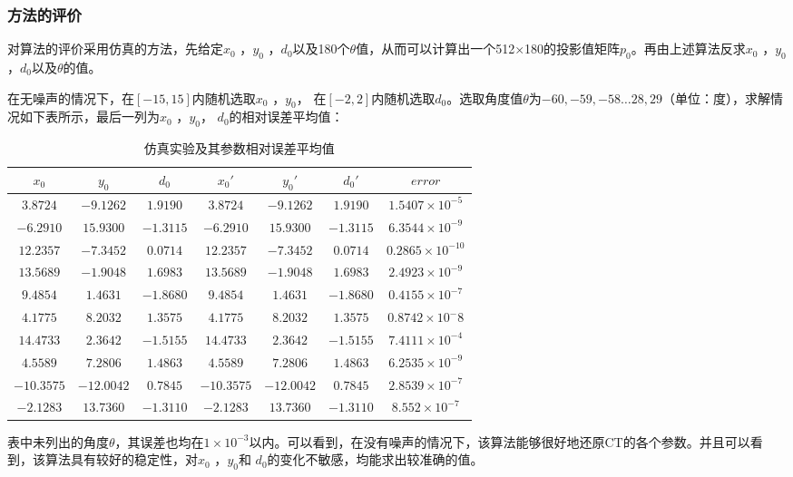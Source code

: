\documentclass{myart}
\begin{document}
\subsubsection{方法的评价}

对算法的评价采用仿真的方法，先给定\( x_0 \) ，\(y_0\) ，\( d_0 \)以及180个\(\theta\)值，从而可以计算出一个512\(\times\)180的投影值矩阵\(p_{0}\)。再由上述算法反求\( x_0 \) ，\(y_0\) ，\( d_0 \)以及\(\theta\)的值。

在无噪声的情况下，在\([-15, 15]\)内随机选取\( x_0 \) ，\(y_0\)， 在\([-2, 2]\)内随机选取\(d_0\)。选取角度值\(\theta\)为\( -60, -59, -58 \ldots 28, 29\)（单位：度），求解情况如下表所示，最后一列为\( x_0 \) ，\(y_0\)， \(d_0\)的相对误差平均值：

\begin{table}[htbp]
  \centering
  \caption{仿真实验及其参数相对误差平均值}
    \begin{tabular}{ccccccc}
    \toprule
    \(x_0\)    & \(y_0\)    & \(d_0\)    & \(x_0'\) & \(y_0'\) & \(d_0'\) & \(error\) \\
    \midrule
    \(3.8724  \) & \(-9.1262 \) & \(1.9190 \) & \(3.8724 \) & \(-9.1262 \) & \(1.9190 \) & \(1.5407\times 10^{-5}\)\\
    \(-6.2910 \) & \(15.9300 \) & \(-1.3115 \) & \(-6.2910 \) & \(15.9300 \) & \(-1.3115 \) & \(6.3544\times 10^{-9}\) \\
    \(12.2357 \) & \(-7.3452 \) & \(0.0714 \) & \(12.2357 \) & \(-7.3452 \) & \(0.0714 \) & \(0.2865\times 10^{-10}\) \\
    \(13.5689 \) & \(-1.9048 \) & \(1.6983 \) & \(13.5689 \) & \(-1.9048 \) & \(1.6983 \) & \(2.4923\times 10^{-9}\) \\
    \(9.4854  \) & \(1.4631 \) & \(-1.8680 \) & \(9.4854 \) & \(1.4631 \) & \(-1.8680 \) & \(0.4155\times 10^{-7}\) \\
    \(4.1775  \) & \(8.2032 \) & \(1.3575 \) & \(4.1775 \) & \(8.2032 \) & \(1.3575 \) & \(0.8742\times 10^-{8}\) \\
    \(14.4733 \) & \(2.3642 \) & \(-1.5155 \) & \(14.4733 \) & \(2.3642 \) & \(-1.5155 \) & \(7.4111\times 10^{-4}\) \\
    \(4.5589  \) & \(7.2806 \) & \(1.4863 \) & \(4.5589 \) & \(7.2806 \) & \(1.4863 \) & \(6.2535\times 10^{-9}\) \\
    \(-10.3575\) & \(-12.0042 \) & \(0.7845 \) & \(-10.3575 \) & \(-12.0042 \) & \(0.7845 \) & \(2.8539\times 10^{-7}\) \\
    \(-2.1283 \) & \(13.7360 \) & \(-1.3110 \) & \(-2.1283 \) & \(13.7360 \) & \(-1.3110 \) & \(8.552\times 10^{-7}\) \\
    \bottomrule
    \end{tabular}%
  \label{tab:addlabel}%
\end{table}
表中未列出的角度\(\theta\)，其误差也均在\(1\times10^{-3}\)以内。可以看到，在没有噪声的情况下，该算法能够很好地还原CT的各个参数。并且可以看到，该算法具有较好的稳定性，对\( x_0 \) ，\(y_0\)和 \(d_0\)的变化不敏感，均能求出较准确的值。
\end{document}
